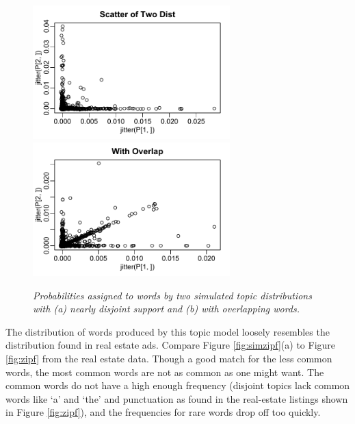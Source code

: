 \documentclass[12pt]{article}
\begin{document}
 
\begin{figure}
 \caption{ \label{fig:simdist}
  \sl Probabilities assigned to words by two simulated topic distributions with (a) nearly disjoint support and (b) with overlapping words.}  
  \centerline{   
     \includegraphics[width=3in]{figures/simdist}    
     \includegraphics[width=3in]{figures/simdistB}    }
\end{figure}


The distribution of words produced by this topic model  loosely resembles the distribution found in real estate ads.  Compare Figure \ref{fig:simzipf}(a) to Figure \ref{fig:zipf} from the real estate data.  Though a good match for the less common words, the most common words are not as common as one might want.  The common words do not have a high enough frequency (disjoint topics lack common words like `a' and `the' and punctuation as found in the real-estate listings shown in Figure \ref{fig:zipf}), and the frequencies for rare words drop off too quickly.  
\end{document}
